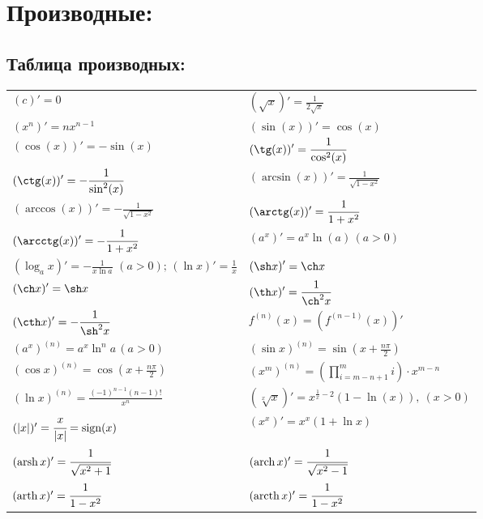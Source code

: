 \documentclass[12pt, a4paper]{article}
\DeclareMathOperator{\sign}{sign}
\DeclareMathOperator{\arch}{arch}
\DeclareMathOperator{\arsh}{arsh}
\DeclareMathOperator{\arth}{arth}
\DeclareMathOperator{\arcth}{arcth}
\begin{document}
\section{Производные:}
\subsection{Таблица производных:}
\begin{tabular}{ll}
$\displaystyle (c)' = 0 $                       &   $\displaystyle (\sqrt{x})'=\frac{1}{2\sqrt{x}}      $ \\
$\displaystyle (x^n)'=nx^{n-1}$                 &   $\displaystyle (\sin(x))'=\cos(x)                          $ \\
$\displaystyle (\cos(x))'=-\sin(x)$             &   $\displaystyle (\tg(x))'=\frac{1}{\cos^2(x)}               $ \\
$\displaystyle (\ctg(x))'=-\frac{1}{\sin^2(x)}$ &   $\displaystyle (\arcsin(x))'=\frac{1}{\sqrt{1-x^2}}  	     $ \\
$\displaystyle (\arccos(x))'=-\frac{1}{\sqrt{1-x^2}}  	$ &   $\displaystyle (\arctg(x))'=\frac{1}{1+x^2}  	   $ \\
$\displaystyle (\arcctg(x))'=-\frac{1}{1+x^2}  	$ &   $\displaystyle (a^x)'=a^x\ln(a) \, (a>0)     $ \\
$\displaystyle (\log_ax)'=-\frac{1}{x\ln a}\,\,(a>0);\,(\ln x)'=\frac{1}{x}  $ &  $\displaystyle (\sh x)'=\ch x  $ \\
$\displaystyle (\ch x)'=\sh x  $ &  $\displaystyle (\th x)'=\frac{1}{\ch^2 x}                                                        $ \\
$\displaystyle (\cth x)'=-\frac{1}{\sh^2 x}  $ &  $\displaystyle f^{(n)}(x)=(f^{(n-1)}(x))'                                       $ \\
$\displaystyle (a^x)^{(n)}=a^x \ln^n a \,(a>0)   $ &  $\displaystyle (\sin x)^{(n)} = \sin\left(x+\frac{n\pi}{2}\right)           $ \\
$\displaystyle (\cos x)^{(n)} = \cos\left(x+\frac{n\pi}{2}\right) $ & $\displaystyle (x^m)^{(n)} = \left(\prod_{i=m-n+1}^{m} i \right) \cdot x^{m-n}     $ \\
$\displaystyle (\ln x)^{(n)} = \frac{(-1)^{n-1} (n-1)!}{x^n} $ &  $ \displaystyle(\sqrt[x]{x})' = x^{\frac{1}{x}-2} (1-\ln(x)), \ (x>0)$ \\
$(|x|)' = \cfrac{x}{|x|} = \sign(x) $ &  $ \left(x^x\right)' = x^x\left(1 + \ln x\right) $ \\
$(\arsh x)' = \cfrac{1}{\sqrt{x^2 + 1}} $ &  $ (\arch x)' = \cfrac{1}{\sqrt{x^2 - 1}}  $ \\
$(\arth x)' = \cfrac{1}{1 - x^2} $ &  $ (\arcth x)' = \cfrac{1}{1 - x^2} $ \\
\end{tabular}
\end{document}
